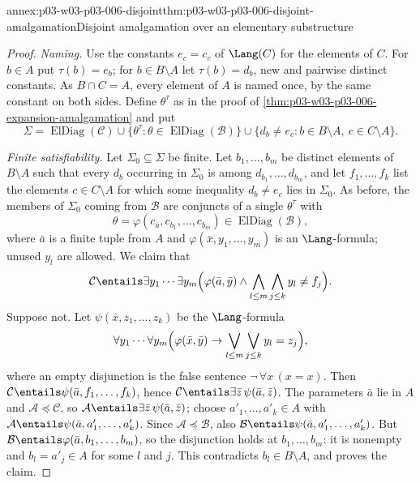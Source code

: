 \begin{annexitem}{annex:p03-w03-p03-006-disjoint}{thm:p03-w03-p03-006-disjoint-amalgamation}{Disjoint amalgamation over an elementary substructure}
\begin{proof}
\emph{Naming.}  Use the constants \(e_c=c_c\) of \(\Lang(C)\) for the
elements of \(C\).  For \(b\in A\) put \(\tau(b)=e_b\); for
\(b\in B\setminus A\) let \(\tau(b)=d_b\), new and pairwise distinct
constants.  As \(B\cap C=A\), every element of \(A\) is named once, by
the same constant on both sides.  Define \(\theta^\tau\) as in the proof of
\cref{thm:p03-w03-p03-006-expansion-amalgamation} and put
\[
 \Sigma=\operatorname{ElDiag}(\mathcal C)
 \cup\{\theta^\tau:\theta\in\operatorname{ElDiag}(\mathcal B)\}
 \cup\{d_b\ne e_c:b\in B\setminus A,\ c\in C\setminus A\}.
\]

\emph{Finite satisfiability.}  Let \(\Sigma_0\subseteq\Sigma\) be finite.
Let \(b_1,\ldots,b_m\) be distinct elements of \(B\setminus A\) such that
every \(d_b\) occurring in \(\Sigma_0\) is among
\(d_{b_1},\ldots,d_{b_m}\), and let \(f_1,\ldots,f_k\) list the elements
\(c\in C\setminus A\) for which some inequality \(d_b\ne e_c\) lies in
\(\Sigma_0\).  As before, the members of \(\Sigma_0\) coming from
\(\mathcal B\) are conjuncts of a single \(\theta^\tau\) with
\[
 \theta=\varphi(c_{\bar a},c_{b_1},\ldots,c_{b_m})\in\operatorname{ElDiag}(\mathcal B),
\]
where \(\bar a\) is a finite tuple from \(A\) and
\(\varphi(\bar x,y_1,\ldots,y_m)\) is an \(\Lang\)-formula; unused
\(y_l\) are allowed.  We claim that
\[
 \mathcal C\entails\exists y_1\cdots\exists y_m\Bigl(\varphi(\bar a,\bar y)
   \land\bigwedge_{l\le m}\bigwedge_{j\le k}y_l\ne f_j\Bigr).
\]
Suppose not.  Let \(\psi(\bar x,z_1,\ldots,z_k)\) be the \(\Lang\)-formula
\[
 \forall y_1\cdots\forall y_m\Bigl(\varphi(\bar x,\bar y)
   \rightarrow\bigvee_{l\le m}\bigvee_{j\le k}y_l=z_j\Bigr),
\]
where an empty disjunction is the false sentence \(\neg\,\forall x\,(x=x)\).
Then \(\mathcal C\entails\psi(\bar a,f_1,\ldots,f_k)\), hence
\(\mathcal C\entails\exists\bar z\,\psi(\bar a,\bar z)\).  The parameters
\(\bar a\) lie in \(A\) and \(\mathcal A\preccurlyeq\mathcal C\), so
\(\mathcal A\entails\exists\bar z\,\psi(\bar a,\bar z)\); choose
\(a'_1,\ldots,a'_k\in A\) with
\(\mathcal A\entails\psi(\bar a,a'_1,\ldots,a'_k)\).  Since
\(\mathcal A\preccurlyeq\mathcal B\), also
\(\mathcal B\entails\psi(\bar a,a'_1,\ldots,a'_k)\).  But
\(\mathcal B\entails\varphi(\bar a,b_1,\ldots,b_m)\), so the disjunction
holds at \(b_1,\ldots,b_m\): it is nonempty and \(b_l=a'_j\in A\) for some
\(l\) and \(j\).  This contradicts \(b_l\in B\setminus A\), and proves the
claim.


\end{proof}
\end{annexitem}
